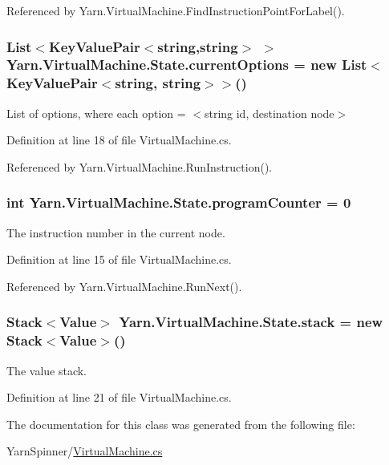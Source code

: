 Referenced by Yarn.\-Virtual\-Machine.\-Find\-Instruction\-Point\-For\-Label().

\hypertarget{a00155_ab816dfea32ecda23282700f01454e0a9}{
\subsubsection[{current\-Options}]{\setlength{\rightskip}{0pt plus 5cm}List$<$Key\-Value\-Pair$<$string,string$>$ $>$ Yarn.\-Virtual\-Machine.\-State.\-current\-Options = new List$<$Key\-Value\-Pair$<$string, string$>$$>$()}}\label{a00155_ab816dfea32ecda23282700f01454e0a9}


List of options, where each option = $<$string id, destination node$>$ 



Definition at line 18 of file Virtual\-Machine.\-cs.



Referenced by Yarn.\-Virtual\-Machine.\-Run\-Instruction().

\hypertarget{a00155_a2c76546b54b4fb573d7f14d79ce230a3}{
\subsubsection[{program\-Counter}]{\setlength{\rightskip}{0pt plus 5cm}int Yarn.\-Virtual\-Machine.\-State.\-program\-Counter = 0}}\label{a00155_a2c76546b54b4fb573d7f14d79ce230a3}


The instruction number in the current node. 



Definition at line 15 of file Virtual\-Machine.\-cs.



Referenced by Yarn.\-Virtual\-Machine.\-Run\-Next().

\hypertarget{a00155_a0bc84abf38b3ff31cbb47363b851c233}{
\subsubsection[{stack}]{\setlength{\rightskip}{0pt plus 5cm}Stack$<${\bf Value}$>$ Yarn.\-Virtual\-Machine.\-State.\-stack = new Stack$<${\bf Value}$>$()\hspace{0.3cm}{\ttfamily [private]}}}\label{a00155_a0bc84abf38b3ff31cbb47363b851c233}


The value stack. 



Definition at line 21 of file Virtual\-Machine.\-cs.



The documentation for this class was generated from the following file\-:\begin{DoxyCompactItemize}
\item 
Yarn\-Spinner/\hyperlink{a00298}{Virtual\-Machine.\-cs}\end{DoxyCompactItemize}
